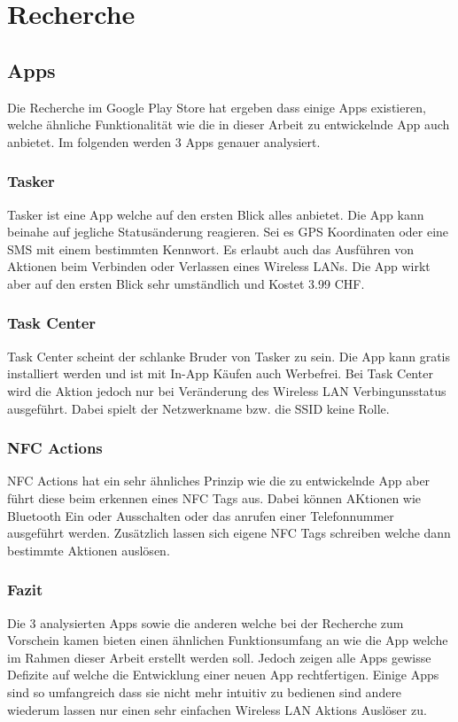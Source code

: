 \chapter{Recherche}
\label{sec:recherche}

\section{Apps}
Die Recherche im Google Play Store hat ergeben dass einige Apps existieren, welche ähnliche Funktionalität wie die in dieser Arbeit zu entwickelnde App auch anbietet. Im folgenden werden 3 Apps genauer analysiert.

\subsection{Tasker}
Tasker\citep{google.play.tasker} ist eine App welche auf den ersten Blick alles anbietet. Die App kann beinahe auf jegliche Statusänderung reagieren. Sei es GPS Koordinaten oder eine SMS mit einem bestimmten Kennwort. Es erlaubt auch das Ausführen von Aktionen beim Verbinden oder Verlassen eines Wireless LANs. Die App wirkt aber auf den ersten Blick sehr umständlich und Kostet 3.99 CHF.

\subsection{Task Center}
Task Center\citep{google.play.taskcenter} scheint der schlanke Bruder von Tasker zu sein. Die App kann gratis installiert werden und ist mit In-App Käufen auch Werbefrei. Bei Task Center wird die Aktion jedoch nur bei Veränderung des Wireless LAN Verbingunsstatus ausgeführt. Dabei spielt der Netzwerkname bzw. die SSID keine Rolle.

\subsection{NFC Actions}
NFC Actions\citep{google.play.nfcactions} hat ein sehr ähnliches Prinzip wie die zu entwickelnde App aber führt diese beim erkennen eines NFC Tags aus. Dabei können AKtionen wie Bluetooth Ein oder Ausschalten oder das anrufen einer Telefonnummer ausgeführt werden. Zusätzlich lassen sich eigene NFC Tags schreiben welche dann bestimmte Aktionen auslösen.

\subsection{Fazit}
Die 3 analysierten Apps sowie die anderen welche bei der Recherche zum Vorschein kamen bieten einen ähnlichen Funktionsumfang an wie die App welche im Rahmen dieser Arbeit erstellt werden soll. Jedoch zeigen alle Apps gewisse Defizite auf welche die Entwicklung einer neuen App rechtfertigen. Einige Apps sind so umfangreich dass sie nicht mehr intuitiv zu bedienen sind andere wiederum lassen nur einen sehr einfachen Wireless LAN Aktions Auslöser zu.



